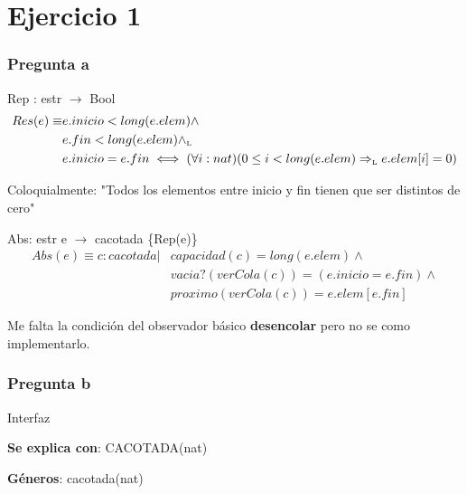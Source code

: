 \section{Ejercicio 1}
\subsubsection*{Pregunta a}

Rep : estr $\rightarrow$ Bool
\begin{align*}
    Res(e) \equiv &e.inicio < long(e.elem) \wedge  \\
    &e.fin < long(e.elem) \land_{\mathrm{\scriptscriptstyle{L}}} \\
    &e.inicio = e.fin \iff (\forall i: nat)(0 \leq i < long(e.elem) \Rightarrow_{\mathrm{\scriptscriptstyle{L}}} e.elem[i] = 0)
\end{align*}

Coloquialmente: "Todos los elementos entre inicio y fin tienen que ser distintos de cero"

Abs: estr e $\rightarrow$ cacotada \{Rep(e)\}
\begin{align*}
    Abs(e) \equiv c: cacotada | &capacidad(c) = long(e.elem) \wedge \\
    &vacia?(verCola(c)) = (e.inicio = e.fin) \wedge \\
    &proximo(verCola(c)) = e.elem[e.fin]
\end{align*}

Me falta la condición del observador básico \textbf{desencolar} pero no se como implementarlo.

\subsubsection*{Pregunta b}
Interfaz

\textbf{Se explica con}: CACOTADA(nat)

\textbf{Géneros}: cacotada(nat)